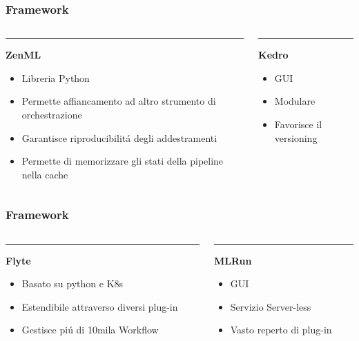 \documentclass[xcolor=dvipsnames]{beamer}
\begin{document}
\begin{frame}
    \frametitle{Framework}
    \begin{columns}[T]
    \begin{column}{0.48\textwidth}
        \color{MSUgreen}\rule{\linewidth}{4pt}
        \textbf{ZenML}
        \begin{itemize}
            \item Libreria Python
            \item Permette affiancamento ad altro strumento di orchestrazione
            \item Garantisce riproducibilitá degli addestramenti
             \item Permette di memorizzare gli stati della pipeline nella cache %
        \end{itemize}
    \end{column}
    
    \begin{column}{0.48\textwidth}
    \color{MSUgreen!40!white}\rule{\linewidth}{4pt}
    
    \textbf{Kedro}    
    \begin{itemize}
        \item GUI
        \item Modulare
        \item Favorisce il versioning
    \end{itemize}
    \end{column}
    \end{columns}
\end{frame}

\begin{frame}
    \frametitle{Framework}
    \begin{columns}[T]
    \begin{column}{0.48\textwidth}
        \color{MSUgreen!60!white}\rule{\linewidth}{4pt}
        \textbf{Flyte}
    \begin{itemize}
        \item Basato su python e K8s
        \item Estendibile attraverso diversi plug-in
        \item Gestisce piú di 10mila Workflow
    \end{itemize}
    \end{column}
    
    \begin{column}{0.48\textwidth}
    \color{MSUgreen!30}\rule{\linewidth}{4pt}
    \textbf{MLRun}
    \begin{itemize}
        \item GUI 
        \item Servizio Server-less
        \item Vasto reperto di plug-in
    \end{itemize}
    \end{column}
    \end{columns}
\end{frame}
\end{document}
